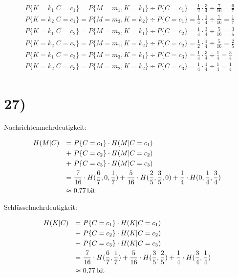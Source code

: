   \begin{align*}
    & P\{K = k_1 | C = c_1\} = P\{M = m_1, K = k_1\} \div P\{C = c_1\} = \frac{1}{2} \cdot \frac{3}{4} \div \frac{7}{16} = \frac{6}{7}\\
    & P\{K = k_2 | C = c_1\} = P\{M = m_3, K = k_2\} \div P\{C = c_1\} = \frac{1}{4} \cdot \frac{1}{4} \div \frac{7}{16} = \frac{1}{7}\\
    & P\{K = k_1 | C = c_2\} = P\{M = m_2, K = k_1\} \div P\{C = c_2\} = \frac{1}{4} \cdot \frac{3}{4} \div \frac{5}{16} = \frac{3}{5}\\
    & P\{K = k_2 | C = c_2\} = P\{M = m_1, K = k_2\} \div P\{C = c_2\} = \frac{1}{2} \cdot \frac{1}{4} \div \frac{5}{16} = \frac{2}{5}\\
    & P\{K = k_1 | C = c_3\} = P\{M = m_3, K = k_1\} \div P\{C = c_3\} = \frac{1}{4} \cdot \frac{3}{4} \div \frac{1}{4} = \frac{3}{4}\\
    & P\{K = k_2 | C = c_3\} = P\{M = m_2, K = k_2\} \div P\{C = c_3\} = \frac{1}{4} \cdot \frac{1}{4} \div \frac{1}{4} = \frac{1}{4}\\
  \end{align*}

  \section*{27)}

  Nachrichtenmehrdeutigkeit:

  \begin{align*}
    & H(M | C) & = &\ P\{C = c_1\} \cdot H(M | C = c_1)\\
    &          & + &\ P\{C = c_2\} \cdot H(M | C = c_2)\\
    &          & + &\ P\{C = c_3\} \cdot H(M | C = c_3)\\
    &          & = &\ \frac{7}{16} \cdot H(\frac{6}{7}, 0,  \frac{1}{7}) + \frac{5}{16} \cdot H(\frac{2}{5}, \frac{3}{5}, 0) + \frac{1}{4} \cdot H(0, \frac{1}{4}, \frac{3}{4})\\
    &          & \approx &\ \SI{0,77}{\bit}
  \end{align*}

  Schlüsselmehrdeutigkeit:

  \begin{align*}
    & H(K | C) & = &\ P\{C = c_1\} \cdot H(K | C = c_1)\\
    &          & + &\ P\{C = c_2\} \cdot H(K | C = c_2)\\
    &          & + &\ P\{C = c_3\} \cdot H(K | C = c_3)\\
    &          & = &\ \frac{7}{16} \cdot H(\frac{6}{7}, \frac{1}{7}) + \frac{5}{16} \cdot H(\frac{3}{5}, \frac{2}{5}) + \frac{1}{4} \cdot H(\frac{3}{4}, \frac{1}{4})\\
    &          & \approx &\ \SI{0,77}{\bit}
  \end{align*}


